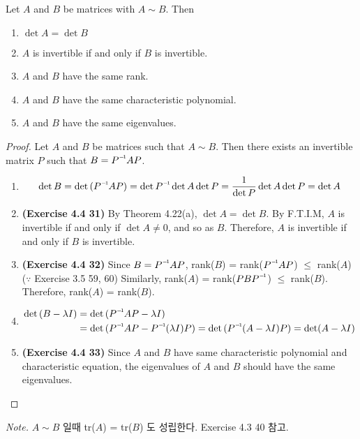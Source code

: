 \begin{theorem}
	Let $ A $ and $ B $ be \nbyn matrices with $ A\sim B $. Then 
	\begin{enumerate}
		\item $ \det A = \det B $
		\item $ A $ is invertible if and only if $ B $ is invertible.
		\item $ A $ and $ B $ have the same rank. 
		\item $ A $ and $ B $ have the same characteristic polynomial.
		\item $ A $ and $ B $ have the same eigenvalues.
	\end{enumerate}
\end{theorem}
\begin{proof}
	Let $A$ and $B$ be \nbyn matrices such that $A \sim B$. Then there exists an invertible \nbyn matrix $P$ such that $B = \inv{P}AP$.
	\begin{enumerate}
		\item \begin{equation*}
			\det{B} = \det{(\inv{P}AP)} = \det\inv{P}\det{A}\det{P} = \frac{1}{\det{P}}\det{A}\det{P} = \det{A}
		\end{equation*}
		\item \textbf{(Exercise 4.4 31)} By Theorem 4.22(a), $\det{A} = \det{B}$. By F.T.I.M, $A$ is invertible if and only if $\det{A} \neq 0$, and so as $B$. Therefore, $A$ is invertible if and only if $B$ is invertible.
		\item \textbf{(Exercise 4.4 32)} Since $B = \inv{P}AP$, rank($B$) = rank($\inv{P}AP$) $\leq$ rank($A$) ($\because$ Exercise 3.5 59, 60) Similarly, rank($A$) = rank($PB\inv{P}$) $\leq$ rank($B$). Therefore, rank($A$) = rank($B$).
		\item \begin{align*}
			\det{(B - \lambda I)} &= \det{(\inv{P}AP - \lambda I)} \\
			&= \det{(\inv{P}AP - \inv{P}(\lambda I)P)} = \det{(\inv{P}(A - \lambda I)P)} = \det(A - \lambda I)
		\end{align*}
		\item \textbf{(Exercise 4.4 33)} Since $A$ and $B$ have same characteristic polynomial and characteristic equation, the eigenvalues of $A$ and $B$ should have the same eigenvalues.
	\end{enumerate}
\end{proof}

\textit{Note.} $A \sim B$ 일때 tr($A$) = tr($B$) 도 성립한다. Exercise 4.3 40 참고. \\


